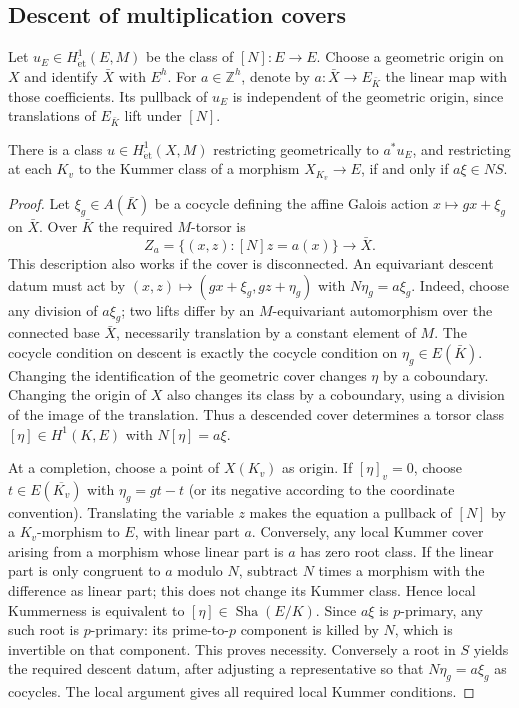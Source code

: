 \documentclass[11pt,a4paper]{article}
\theoremstyle{remark}\newtheorem{remark}[theorem]{Remark}
\newcommand{\Sha}{\mathop{\mathrm{Sha}}}\newcommand{\Pic}{\operatorname{Pic}}\newcommand{\Br}{\operatorname{Br}}\newcommand{\NS}{\operatorname{NS}}\newcommand{\Gal}{\operatorname{Gal}}\newcommand{\Hom}{\operatorname{Hom}}\newcommand{\Z}{\mathbb Z}\newcommand{\Q}{\mathbb Q}\newcommand{\F}{\mathbb F}\newcommand{\G}{\mathbb G}\newcommand{\coker}{\operatorname{coker}}\newcommand{\loc}{\operatorname{loc}}\newcommand{\et}{\mathrm{\acute et}}\newcommand{\Div}{\operatorname{Div}}\newcommand{\ord}{\operatorname{ord}}\newcommand{\im}{\operatorname{im}}\newcommand{\diag}{\operatorname{diag}}\newcommand{\rank}{\operatorname{rank}}\newcommand{\Sel}{\operatorname{Sel}}
\begin{document}
\subsection{Descent of multiplication covers}
Let $u_E\in H^1_{\et}(E,M)$ be the class of $[N]:E\to E$. Choose a geometric origin on $X$ and identify $\bar X$ with $E^h$. For $a\in\Z^h$, denote by $a:\bar X\to E_{\bar K}$ the linear map with those coefficients. Its pullback of $u_E$ is independent of the geometric origin, since translations of $E_{\bar K}$ lift under $[N]$.
\begin{lemma}\label{cover}
There is a class $u\in H^1_{\et}(X,M)$ restricting geometrically to $a^*u_E$, and restricting at each $K_v$ to the Kummer class of a morphism $X_{K_v}\to E$, if and only if $a\xi\in N S$.
\end{lemma}
\begin{proof}
Let $\xi_g\in A(\bar K)$ be a cocycle defining the affine Galois action $x\mapsto gx+\xi_g$ on $\bar X$. Over $\bar K$ the required $M$-torsor is
\[
 Z_a=\{(x,z):[N]z=a(x)\}\longrightarrow\bar X.
\]
This description also works if the cover is disconnected. An equivariant descent datum must act by $(x,z)\mapsto(gx+\xi_g,gz+\eta_g)$ with $N\eta_g=a\xi_g$. Indeed, choose any division of $a\xi_g$; two lifts differ by an $M$-equivariant automorphism over the connected base $\bar X$, necessarily translation by a constant element of $M$. The cocycle condition on descent is exactly the cocycle condition on $\eta_g\in E(\bar K)$. Changing the identification of the geometric cover changes $\eta$ by a coboundary. Changing the origin of $X$ also changes its class by a coboundary, using a division of the image of the translation. Thus a descended cover determines a torsor class $[\eta]\in H^1(K,E)$ with $N[\eta]=a\xi$.

At a completion, choose a point of $X(K_v)$ as origin. If $[\eta]_v=0$, choose $t\in E(\overline{K_v})$ with $\eta_g=gt-t$ (or its negative according to the coordinate convention). Translating the variable $z$ makes the equation a pullback of $[N]$ by a $K_v$-morphism to $E$, with linear part $a$. Conversely, any local Kummer cover arising from a morphism whose linear part is $a$ has zero root class. If the linear part is only congruent to $a$ modulo $N$, subtract $N$ times a morphism with the difference as linear part; this does not change its Kummer class. Hence local Kummerness is equivalent to $[\eta]\in\Sha(E/K)$. Since $a\xi$ is $p$-primary, any such root is $p$-primary: its prime-to-$p$ component is killed by $N$, which is invertible on that component. This proves necessity. Conversely a root in $S$ yields the required descent datum, after adjusting a representative so that $N\eta_g=a\xi_g$ as cocycles. The local argument gives all required local Kummer conditions.
\end{proof}
\end{document}
